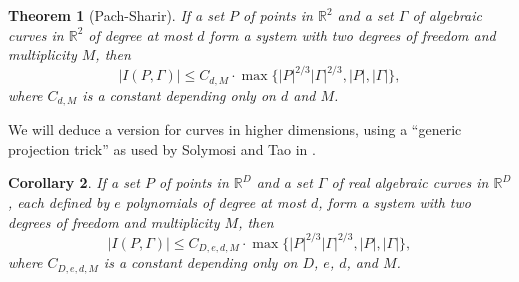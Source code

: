 \documentclass[12pt]{article}
\newtheorem{theorem}{Theorem}[section]
\newtheorem{corollary}[theorem]{Corollary}
\newcommand{\RR}{\mathbb R}
\begin{document}
\begin{theorem}[Pach-Sharir]\label{thm:pachsharir}
 If a set $P$ of points in $\RR^2$ and a set $\Gamma$ of algebraic curves in $\RR^2$ of degree at most $d$ form a system with two degrees of freedom and multiplicity $M$, then
 $$|I(P,\Gamma)| \leq C_{d,M} \cdot  \max\{|P|^{2/3}|\Gamma|^{2/3}, |P|, |\Gamma|\},$$
 where $C_{d,M}$ is a constant depending only on $d$ and $M$.
\end{theorem}


We will deduce a version for curves in higher dimensions, using a ``generic projection trick'' as used by Solymosi and Tao in \cite[Section 5.1]{solymosi:incidence}.


\begin{corollary}\label{cor:incidences}
  If a set $P$ of points in $\RR^D$ and a set $\Gamma$ of real algebraic curves in $\RR^D$, each defined by $e$ polynomials of degree at most $d$, form a system with two degrees of freedom and multiplicity $M$, then
 $$|I(P,\Gamma)| \leq C_{D,e,d,M} \cdot  \max\{|P|^{2/3}|\Gamma|^{2/3}, |P|, |\Gamma|\},$$
 where $C_{D,e,d,M}$ is a constant depending only on $D$, $e$, $d$, and $M$.
\end{corollary}
\end{document}
